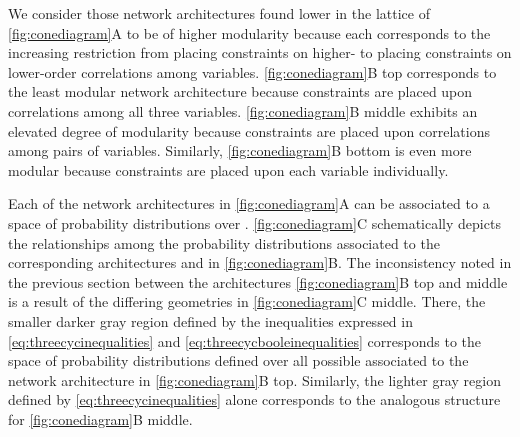 We consider those network architectures found lower in the lattice of \ref{fig:conediagram}A to be of higher modularity because each corresponds to the increasing restriction from placing constraints on higher- to placing constraints on lower-order correlations among variables. \ref{fig:conediagram}B top corresponds to the least modular network architecture because constraints are placed upon correlations among all three variables. \ref{fig:conediagram}B middle exhibits an elevated degree of modularity because constraints are placed upon correlations among pairs of variables. Similarly, \ref{fig:conediagram}B bottom is even more modular because constraints are placed upon each variable individually.

Each of the network architectures in \ref{fig:conediagram}A can be associated to a space of probability distributions over \gnpm{}. \ref{fig:conediagram}C schematically depicts the relationships among the probability distributions associated to the corresponding architectures and \gnpm{} in \ref{fig:conediagram}B. The inconsistency noted in the previous section between the architectures \ref{fig:conediagram}B top and middle is a result of the differing geometries in \ref{fig:conediagram}C middle. There, the smaller darker gray region defined by the inequalities expressed in \ref{eq:threecycinequalities} and \ref{eq:threecycbooleinequalities} corresponds to the space of probability distributions defined over all possible \gnpm{} associated to the network architecture in \ref{fig:conediagram}B top. Similarly, the lighter gray region defined by \ref{eq:threecycinequalities} alone corresponds to the analogous structure for \ref{fig:conediagram}B middle.


